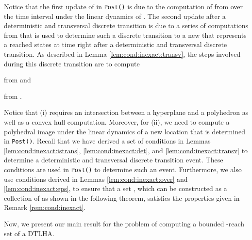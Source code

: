 Notice that the first update of  in {\tt Post()} is due to the computation of  from  over the time interval  under the linear dynamics of .
The second update after a deterministic and transversal discrete transition is due to a series of computations from  that is used to determine such a discrete transition to a new  that represents a reached states at time  right after a deterministic and transversal discrete transition.
As described in Lemma \ref{lem:cond:inexact:transv}, the steps involved during this discrete transition are to compute
\begin{inparaenum}[(i)]
	\item  from  and
	\item  from . 
\end{inparaenum}
Notice that (i) requires an intersection between a hyperplane and a polyhedron as well as a convex hull computation.
Moreover, for (ii), we need to compute a polyhedral image under the linear dynamics of a new location that is determined in {\tt Post()}.
Recall that we have derived a set of conditions in Lemmas \ref{lem:cond:inexact:istrans}, \ref{lem:cond:inexact:det}, and \ref{lem:cond:inexact:transv} to determine a deterministic and transversal discrete transition event.
These conditions are used in {\tt Post()} to determine such an event.
Furthermore, we also use conditions derived in Lemmas \ref{lem:cond:inexact:over} and \ref{lem:cond:inexact:eps}, to ensure that a set , which can be constructed as a collection of  as shown in the following theorem, satisfies the properties given in Remark \ref{rem:cond:inexact}.



Now, we present our main result for the problem of computing a bounded -reach set of a DTLHA.


